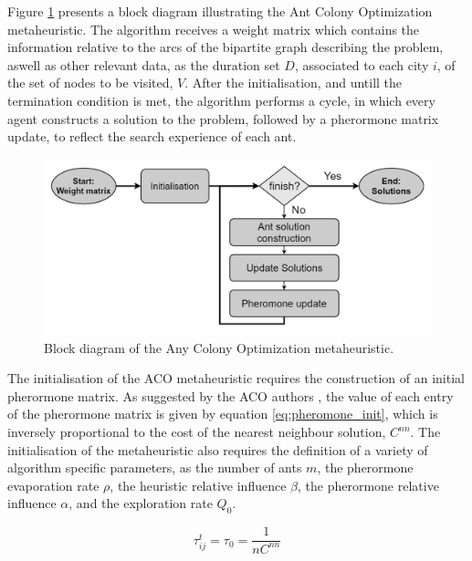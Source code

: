 Figure \ref{fig:aco_block_diagram} presents a block diagram illustrating the Ant
Colony Optimization metaheuristic. The algorithm receives a weight matrix which
contains the information relative to the arcs of the bipartite graph describing
the problem, aswell as other relevant data, as the duration set $D$, associated
to each city $i$, of the set of nodes to be visited, $V$. After the
initialisation, and untill the termination condition is met, the algorithm
performs a cycle, in which every agent constructs a solution to the problem,
followed by a pherormone matrix update, to reflect the search experience of each
ant.

\begin{figure}[htpb]
  \centering
  \includegraphics[width=\textwidth]{Figures/system_implementation/aco_base.png}
  \caption{Block diagram of the Any Colony Optimization metaheuristic.}
  \label{fig:aco_block_diagram}  
\end{figure}

The initialisation of the ACO metaheuristic requires the construction of an
initial pherormone matrix. As suggested by the ACO authors \cite{aco_2}, the
value of each entry of the pherormone matrix is given by equation
\ref{eq:pheromone_init}, which is inversely proportional to the cost of the
nearest neighbour solution, $C^{nn}$. The initialisation of the metaheuristic
also requires the definition of a variety of algorithm specific parameters, as
the number of ants $m$, the pherormone evaporation rate $\rho$, the heuristic
relative influence $\beta$, the pherormone relative influence $\alpha$, and the
exploration rate $Q_0$. 

\begin{equation}
\label{eq:pheromone_init}
  \tau_{ij}^{t} = \tau_{0} = \frac{1}{nC^{nn}}
\end{equation}

